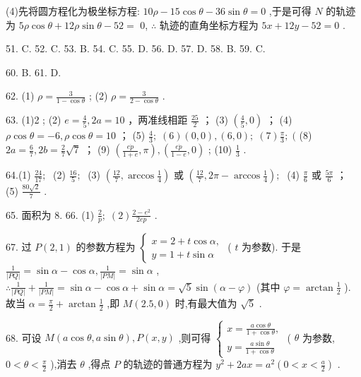 \documentclass[10pt]{article}
\begin{document}
(4)先将圆方程化为极坐标方程: \({10\rho } - {15}\cos \theta  - {36}\sin \theta  = 0\) ,于是可得 \(N\) 的轨迹为 \({5\rho }\cos \theta  + {12\rho }\sin \theta  - {52} =\) 0, \(\therefore\) 轨迹的直角坐标方程为 \({5x} + {12y} - {52} = 0\) .

51. C. 52. C. 53. B. 54. C. 55. D. 56. D. 57. D. 58. B. 59. C.

60. B. 61. D.

62. (1) \(\rho  = \frac{3}{1 - \cos \theta }\) ; (2) \(\rho  = \frac{3}{2 - \cos \theta }\) .

63. (1)2 ; (2) \(e = \frac{4}{5},{2a} = {10}\) ，两准线相距 \(\frac{25}{2}\) ； (3) \(\left( {\frac{4}{5},0}\right)\) ； (4) \(\rho \cos \theta  =  - 6,\rho \cos \theta  = {10}\) ； (5) \(\frac{4}{3};\;\left( 6\right) \left( {0,0}\right) ,\left( {6,0}\right) ;\;\left( 7\right) \frac{\pi }{3};\;(\) (8) \({2a} = \frac{6}{7},{2b} = \frac{2}{7}\sqrt{7}\) ； (9) \(\left( {\frac{e\dot{p}}{1 + e},\pi }\right) ,\left( {\frac{e\dot{p}}{1 - e},0}\right)\) ; (10) \(\frac{1}{3}\) .

64.(1) \(\frac{24}{17};\;\) (2) \(\frac{16}{5};\;\) (3) \(\left( {\frac{12}{7},\arccos \frac{1}{4}}\right)\) 或 \(\left( {\frac{12}{7},{2\pi } - \arccos \frac{1}{4}}\right) ;\;\) (4) \(\frac{\pi }{6}\) 或 \(\frac{5\pi }{6}\) ； (5) \(\frac{{80}\sqrt{2}}{7}\) .

65. 面积为 8. 66. (1) \(\frac{2}{p};\;\left( 2\right) \frac{2 - {e}^{2}}{2ep}\) .

67. 过 \(P\left( {2,1}\right)\) 的参数方程为 \(\left\{  \begin{array}{l} x = 2 + t\cos \alpha , \\  y = 1 + t\sin \alpha  \end{array}\right.\) ( \(t\) 为参数). 于是 \(\frac{1}{\left| PQ\right| } = \sin \alpha  - \cos \alpha ,\frac{1}{\left| PM\right| } = \sin \alpha\) , \(\therefore \frac{1}{\left| PQ\right| } + \frac{1}{\left| PM\right| } = \sin \alpha  - \cos \alpha  + \sin \alpha  = \sqrt{5}\sin \left( {\alpha  - \varphi }\right)\) (其中 \(\varphi  = \arctan \frac{1}{2}\) ). 故当 \(\alpha  = \frac{\pi }{2} + \arctan \frac{1}{2}\) ,即 \(M\left( {{2.5},0}\right)\) 时,有最大值为 \(\sqrt{5}\) .

68. 可设 \(M\left( {a\cos \theta ,a\sin \theta }\right) ,P\left( {x,y}\right)\) ,则可得 \(\left\{  \begin{array}{l} x = \frac{a\cos \theta }{1 + \cos \theta }, \\  y = \frac{a\sin \theta }{1 + \cos \theta } \end{array}\right.\) ( \(\theta\) 为参数, \(0 < \theta  < \frac{\pi }{2}\) ),消去 \(\theta\) ,得点 \(P\) 的轨迹的普通方程为 \({y}^{2} + {2ax} = {a}^{2}\left( {0 < x < \frac{a}{2}}\right)\) .
\end{document}
